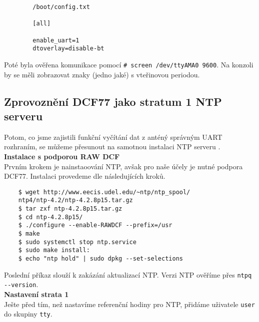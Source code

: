     \vspace{1em}

    \begin{lstlisting}
        /boot/config.txt

        [all]

        enable_uart=1
        dtoverlay=disable-bt
    \end{lstlisting}

    \vspace{1em}

   Poté byla ověřena komunikace pomocí \verb|# screen /dev/ttyAMA0 9600|. Na konzoli by
   se měli zobrazovat znaky (jedno jaké) s vteřinovou periodou.

\newpage

\subsection{Zprovoznění DCF77 jako stratum 1 NTP serveru}
    Potom, co jsme zajistili funkční vyčítání dat z anténý správným UART rozhraním, se
    můžeme přesunout na samotnou instalaci NTP serveru \cite{ntporg}.
    \\

    \textbf{Instalace s podporou RAW DCF}
    \\

    Prvním krokem je nainstaoování NTP, avšak pro naše účely je nutné podpora DCF77.
    Instalaci provedeme dle následujících kroků.

    \vspace{1em}

    \begin{lstlisting}
    $ wget http://www.eecis.udel.edu/~ntp/ntp_spool/
    ntp4/ntp-4.2/ntp-4.2.8p15.tar.gz
    $ tar zxf ntp-4.2.8p15.tar.gz
    $ cd ntp-4.2.8p15/
    $ ./configure --enable-RAWDCF --prefix=/usr
    $ make
    $ sudo systemctl stop ntp.service
    $ sudo make install:
    $ echo "ntp hold" | sudo dpkg --set-selections
    \end{lstlisting}

    \vspace{1em}

    Poslední příkaz slouží k zakázání aktualizací NTP. Verzi NTP ověříme přes
    \verb|ntpq --version|.
    \\

    \textbf{Nastavení strata 1}
    \\

    Ješte před tím, než nastavíme referenční hodiny pro NTP, přidáme uživatele \verb|user| do skupiny
    \verb|tty|.

